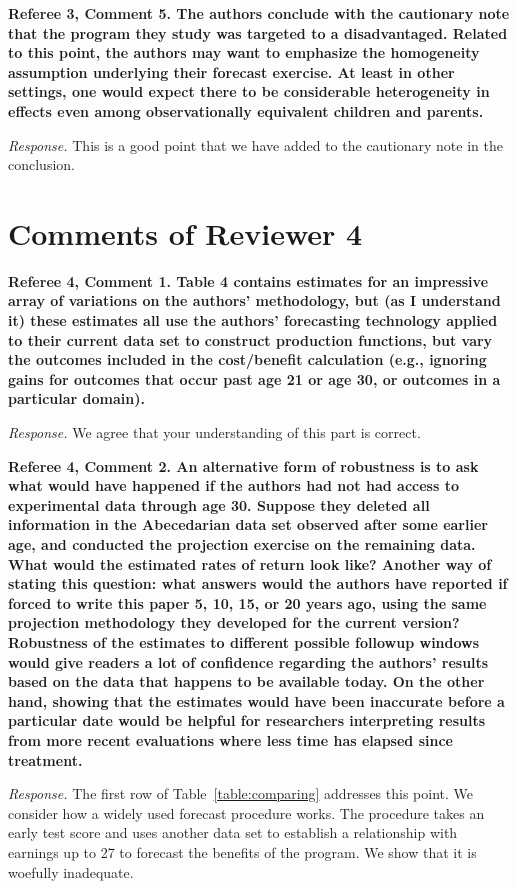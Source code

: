 \noindent \textbf{Referee 3, Comment 5. The authors conclude with the cautionary note that the program they study was targeted to a disadvantaged. Related to this point, the authors may want to emphasize the homogeneity assumption underlying their forecast exercise. At least in other settings, one would expect there to be considerable heterogeneity in effects even among observationally equivalent children and parents.}

\noindent \textit{Response.} This is a good point that we have added to the cautionary note in the conclusion.

\section*{Comments of Reviewer 4}

\noindent \textbf{Referee 4, Comment 1. Table 4 contains estimates for an impressive array of variations on the authors' methodology, but (as I understand it) these estimates all use the authors' forecasting technology applied to their current data set to construct production functions, but vary the outcomes included in the cost/benefit calculation (e.g., ignoring gains for outcomes that occur past age 21 or age 30, or outcomes in a particular domain).}

\noindent \textit{Response.} We agree that your understanding of this part is correct.

\noindent \textbf{Referee 4, Comment 2. An alternative form of robustness is to ask what would have happened if the authors had not had access to experimental data through age 30. Suppose they deleted all information in the Abecedarian data set observed after some earlier age, and conducted the projection exercise on the remaining data. What would the estimated rates of return look like? Another way of stating this question: what answers would the authors have reported if forced to write this paper 5, 10, 15, or 20 years ago, using the same projection methodology they developed for the current version? Robustness of the estimates to different possible followup windows would give readers a lot of confidence regarding the authors' results based on the data that happens to be available today. On the other hand, showing that the estimates would have been inaccurate before a particular date would be helpful for researchers interpreting results from more recent evaluations where less time has elapsed since treatment.}

\noindent \textit{Response.} The first row of Table~\ref{table:comparing} addresses this point. We consider how a widely used forecast procedure works. The procedure takes an early test score and uses another data set to establish a relationship with earnings up to 27 to forecast the benefits of the program. We show that it is woefully inadequate. 

